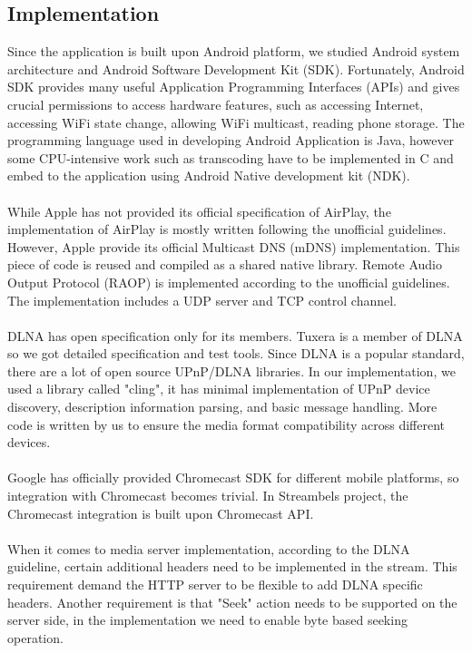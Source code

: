 \subsection{Implementation}
Since the application is built upon Android platform, we studied Android system architecture and Android Software Development Kit (SDK). Fortunately, Android SDK provides many useful Application Programming Interfaces (APIs) and gives crucial permissions to access hardware features, such as accessing Internet, accessing WiFi state change, allowing WiFi multicast, reading phone storage. The programming language used in developing Android Application is Java, however some CPU-intensive work such as transcoding have to be implemented in C and embed to the application using Android Native development kit (NDK).\\
\\
While Apple has not provided its official specification of AirPlay, the implementation of AirPlay is mostly written following the unofficial guidelines. However, Apple provide its official Multicast DNS (mDNS) implementation. This piece of code is reused and compiled as a shared native library. Remote Audio Output Protocol (RAOP) is
implemented according to the unofficial guidelines. The implementation includes a UDP server and TCP control channel.\\
\\
DLNA has open specification only for its members. Tuxera is a member of DLNA so we got detailed specification and test tools. Since DLNA is a popular standard, there are a lot of open source UPnP/DLNA
libraries. In our implementation, we used a library called "cling"\cite{cling}, it has minimal implementation of UPnP
device discovery, description information parsing, and basic message handling. More code is written by us to ensure the media format compatibility across different devices.\\
\\
Google has officially provided Chromecast SDK for different mobile platforms, so integration with Chromecast becomes trivial. In Streambels project, the Chromecast integration is built upon Chromecast API.\\
\\
When it comes to media server implementation, according to the DLNA guideline,
certain additional headers need to be implemented in the stream. This
requirement demand the HTTP server to be flexible to add DLNA specific
headers. Another requirement is that "Seek" action needs to be supported on the server side, in the implementation we need to enable byte based seeking operation.\\
